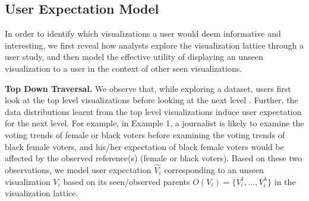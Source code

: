 
\subsection{User Expectation Model}
In order to identify which visualizations a user would deem informative and interesting, we first reveal how analysts explore the visualization lattice through a user study, and then model the effective utility of displaying an unseen visualization to a user in the context of other seen visualizations. 
 
\textbf{Top Down Traversal.} We observe that, while exploring a dataset, users first look at the top level visualizations before looking at the next level \cite{Kim2017, Hullman2013}. Further, the data distributions learnt from the top level visualizations induce user expectation for the next level. For example, in Example 1, a journalist is likely to examine the voting trends of female or black voters before examining the voting trends of black female voters, and his/her expectation of black female voters would be affected by the observed reference(s) (female or black voters). Based on these two observations, we model user expectation $\hat{V_i}$ corresponding to an unseen visualization $V_i$ based on its seen/observed parents $O(V_i) = \{V_i^1, \ldots, V_i^\lambda\}$ in the visualization lattice. 

